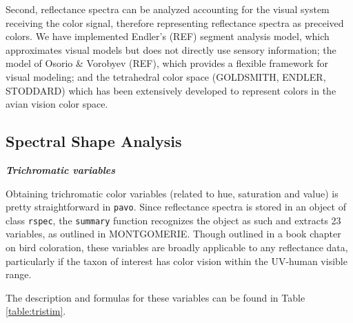 \documentclass{article}
\newcommand{\pavo}{{\tt pavo}}  %
\newcommand{\code}[1]{{\tt #1}}  %
\begin{document}
Second, reflectance spectra can be analyzed accounting for the visual system receiving the color 
signal, therefore representing reflectance spectra as preceived colors. We have implemented 
Endler's (REF) segment analysis model, which approximates visual models but does not directly 
use sensory information; the model of Osorio \& Vorobyev (REF), which provides a flexible 
framework for visual modeling; and the tetrahedral color space (GOLDSMITH, ENDLER, STODDARD) 
which has been extensively developed to represent colors in the avian vision color space.

\subsection{Spectral Shape Analysis}

\textit{\textbf{Trichromatic variables}}

Obtaining trichromatic color variables (related to hue, saturation and value) is pretty
straightforward in \pavo{}. Since reflectance spectra is stored in an object of class 
\code{rspec}, the \code{summary} function recognizes the object as such and extracts 23 
variables, as outlined in MONTGOMERIE. Though outlined in a book chapter on bird coloration, 
these variables are broadly applicable to any reflectance data, particularly if the taxon of 
interest has color vision within the UV-human visible range.

The description and formulas for these variables can be found in Table \ref{table:tristim}.
\end{document}
